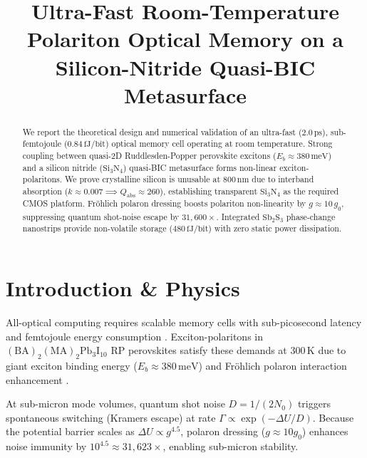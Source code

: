 \documentclass[10pt, conference]{IEEEtran}
\begin{document}
\title{Ultra-Fast Room-Temperature Polariton Optical Memory on a Silicon-Nitride Quasi-BIC Metasurface}

\author{
}

\maketitle

\begin{abstract}
We report the theoretical design and numerical validation of an ultra-fast ($2.0\,\text{ps}$), sub-femtojoule ($0.84\,\text{fJ/bit}$) optical memory cell operating at room temperature. Strong coupling between quasi-2D Ruddlesden-Popper perovskite excitons ($E_b \approx 380\,\text{meV}$) and a silicon nitride ($\text{Si}_3\text{N}_4$) quasi-BIC metasurface forms non-linear exciton-polaritons. We prove crystalline silicon is unusable at $800\,\text{nm}$ due to interband absorption ($k \approx 0.007 \implies Q_{\text{abs}} \approx 260$), establishing transparent $\text{Si}_3\text{N}_4$ as the required CMOS platform. Fr\"ohlich polaron dressing boosts polariton non-linearity by $g \approx 10\,g_0$, suppressing quantum shot-noise escape by $31{,}600\times$. Integrated $\text{Sb}_2\text{S}_3$ phase-change nanostrips provide non-volatile storage ($480\,\text{fJ/bit}$) with zero static power dissipation.
\end{abstract}

\section{Introduction \& Physics}
All-optical computing requires scalable memory cells with sub-picosecond latency and femtojoule energy consumption \cite{miller_photonics}. Exciton-polaritons in $(\text{BA})_2(\text{MA})_2\text{Pb}_3\text{I}_{10}$ RP perovskites satisfy these demands at $300\,\text{K}$ due to giant exciton binding energy ($E_b \approx 380\,\text{meV}$) and Fr\"ohlich polaron interaction enhancement \cite{masharin_nanolett}.

At sub-micron mode volumes, quantum shot noise $D = 1/(2N_0)$ triggers spontaneous switching (Kramers escape) at rate $\Gamma \propto \exp(-\Delta U / D)$. Because the potential barrier scales as $\Delta U \propto g^{4.5}$, polaron dressing ($g \approx 10 g_0$) enhances noise immunity by $10^{4.5} \approx 31{,}623\times$, enabling sub-micron stability.
\end{document}
